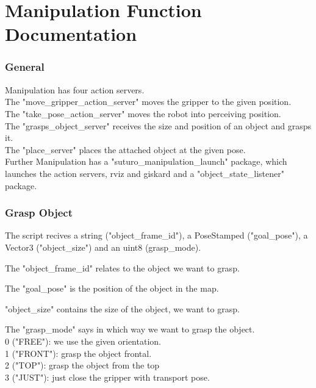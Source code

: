 \documentclass[main.tex]{subfiles}
\begin{document}
	\begingroup

	\renewcommand{\cleardoublepage}{}

	\renewcommand{\clearpage}{}

	\chapter{Manipulation Function Documentation}


		
		\subsection{General}

		Manipulation has four action servers.\\
		The "move\_gripper\_action\_server" moves the gripper to the given position.\\
		The "take\_pose\_action\_server" moves the robot into perceiving position.\\
		The "grasps\_object\_server" receives the size and position of an object and grasps it.\\
		The "place\_server" places the attached object at the given pose.\\
		Further Manipulation has a "suturo\_manipulation\_launch" package, which launches the action servers, rviz and giskard and a "object\_state\_listener" package.

		\subsection{Grasp Object} 
			The script recives a string ("object\_frame\_id"), a PoseStamped ("goal\_pose"), a Vector3 ("object\_size") and an uint8 (grasp\_mode).
			
			\vspace{0,25 cm}
			The "object\_frame\_id" relates to the object we want to grasp.
		
			\vspace{0,25 cm}
			The "goal\_pose" is the position of the object in the map.

			\vspace{0,25 cm}
			"object\_size" contains the size of the object, we want to grasp.
			
			\vspace{0,25 cm}
			The "grasp\_mode" says in which way we want to grasp the object. \\ 
			0 ("FREE"): we use the given orientation.\\
			 1 ("FRONT"): grasp the object frontal.\\
			 2 ("TOP"): grasp the object from the top\\
			 3 ("JUST"): just close the gripper with transport pose.
			 
\end{document}
